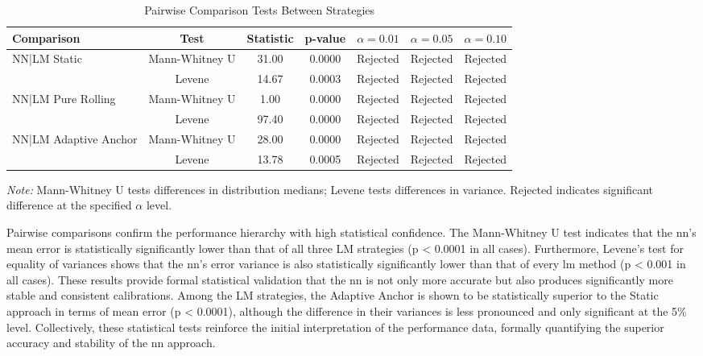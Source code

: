 \begin{table}[H]
	\centering
	\begin{threeparttable}
		\caption{Pairwise Comparison Tests Between Strategies}
		\label{tab:pairwise_tests}
		\begin{tabular}{lcccccc}
			\toprule
			Comparison               & Test           & Statistic & p-value & $\alpha=0.01$ & $\alpha=0.05$ & $\alpha=0.10$ \\
			\midrule
			NN|LM Static          & Mann-Whitney U & 31.00   & 0.0000  & Rejected      & Rejected      & Rejected      \\
			                      & Levene         & 14.67   & 0.0003  & Rejected      & Rejected      & Rejected      \\
			NN|LM Pure Rolling    & Mann-Whitney U & 1.00    & 0.0000  & Rejected      & Rejected      & Rejected      \\
			                      & Levene         & 97.40   & 0.0000  & Rejected      & Rejected      & Rejected      \\
			NN|LM Adaptive Anchor & Mann-Whitney U & 28.00   & 0.0000  & Rejected      & Rejected      & Rejected      \\
			                      & Levene         & 13.78   & 0.0005  & Rejected      & Rejected      & Rejected      \\
			\bottomrule
		\end{tabular}
		\begin{tablenotes}
			\footnotesize
			\item \textit{Note:} Mann-Whitney U tests differences in distribution medians; Levene tests differences in variance. Rejected indicates significant difference at the specified $\alpha$ level.
		\end{tablenotes}
	\end{threeparttable}
\end{table}

Pairwise comparisons confirm the performance hierarchy with high statistical confidence. The Mann-Whitney U test indicates that the \ac{nn}'s mean error is statistically significantly lower than that of all three LM strategies (p < 0.0001 in all cases). Furthermore, Levene's test for equality of variances shows that the \ac{nn}'s error variance is also statistically significantly lower than that of every \ac{lm} method (p < 0.001 in all cases). These results provide formal statistical validation that the \ac{nn} is not only more accurate but also produces significantly more stable and consistent calibrations. Among the LM strategies, the Adaptive Anchor is shown to be statistically superior to the Static approach in terms of mean error (p < 0.0001), although the difference in their variances is less pronounced and only significant at the 5\% level. Collectively, these statistical tests reinforce the initial interpretation of the performance data, formally quantifying the superior accuracy and stability of the \ac{nn} approach.


